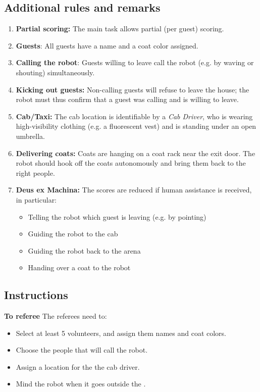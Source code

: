 \subsection*{Additional rules and remarks}
\begin{enumerate}[nosep]
	\item \textbf{Partial scoring:} The main task allows partial (per guest) scoring.

	\item \textbf{Guests}: All guests have a name and a coat color assigned.

	\item \textbf{Calling the robot}: Guests willing to leave call the robot (e.g. by waving or shouting) simultaneously.

	\item \textbf{Kicking out guests:} Non-calling guests will refuse to leave the house; the robot must thus confirm that a guest was calling and is willing to leave.


	\item \textbf{Cab/Taxi:} The cab location is identifiable by a \emph{Cab Driver}, who is wearing high-visibility clothing (e.g. a fluorescent vest) and is standing under an open umbrella.

	\item \textbf{Delivering coats:} Coats are hanging on a coat rack near the exit door.
	The robot should hook off the coats autonomously and bring them back to the right people.

	\item \textbf{Deus ex Machina:} The scores are reduced if human assistance is received, in particular:
	\begin{itemize}
		\item Telling the robot which guest is leaving (e.g. by pointing)
		\item Guiding the robot to the cab
		\item Guiding the robot back to the arena
		\item Handing over a coat to the robot
	\end{itemize}
\end{enumerate}


\subsection*{Instructions}

\textbf{To referee}
The referees need to:
\begin{itemize}
	\item Select at least 5 volunteers, and assign them names and coat colors.
	\item Choose the people that will call the robot.
	\item Assign a location for the the cab driver.
	\item Mind the robot when it goes outside the \Arena{}.
\end{itemize}

